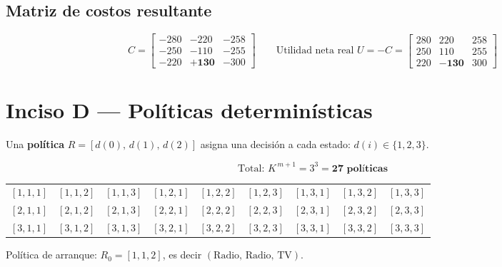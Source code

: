 \documentclass[12pt,a4paper]{article}
\begin{document}
\subsection*{Matriz de costos resultante}

\[
\boxed{ C = \begin{bmatrix}
-280 & -220 & -258 \\
-250 & -110 & -255 \\
-220 & \mathbf{+130} & -300
\end{bmatrix} }
\qquad
\text{Utilidad neta real } U = -C = \begin{bmatrix}
280 & 220 & 258 \\
250 & 110 & 255 \\
220 & \mathbf{-130} & 300
\end{bmatrix}
\]

\newpage

\section{Inciso D --- Políticas determinísticas}

Una \textbf{política} $R = [d(0),\, d(1),\, d(2)]$ asigna una decisión a cada estado: $d(i) \in \{1,2,3\}$.

\[
\text{Total: } K^{\,m+1} = 3^{3} = \mathbf{27 \text{ políticas}}
\]

\begin{center}
\footnotesize
\begin{tabular}{c c c | c c c | c c c}
\toprule
$[1,1,1]$ & $[1,1,2]$ & $[1,1,3]$ & $[1,2,1]$ & $[1,2,2]$ & $[1,2,3]$ & $[1,3,1]$ & $[1,3,2]$ & $[1,3,3]$ \\
$[2,1,1]$ & $[2,1,2]$ & $[2,1,3]$ & $[2,2,1]$ & $[2,2,2]$ & $[2,2,3]$ & $[2,3,1]$ & $[2,3,2]$ & $[2,3,3]$ \\
$[3,1,1]$ & $[3,1,2]$ & $[3,1,3]$ & $[3,2,1]$ & $[3,2,2]$ & $[3,2,3]$ & $[3,3,1]$ & $[3,3,2]$ & $[3,3,3]$ \\
\bottomrule
\end{tabular}
\end{center}

\vspace{0.3cm}
Política de arranque: $R_0 = [1, 1, 2]$, es decir $(\text{Radio},\, \text{Radio},\, \text{TV})$.

\newpage

\end{document}
